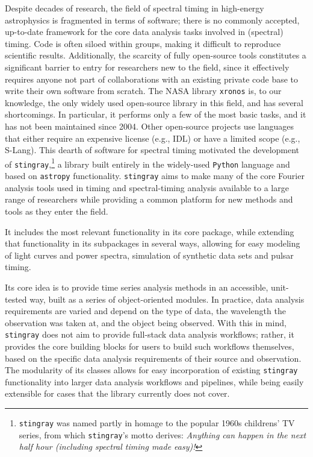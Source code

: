 \documentclass[twocolumn]{aastex62}
\newcommand{\python}{\texttt{Python}\xspace}
\newcommand{\stingray}{\texttt{stingray}\xspace}
\newcommand{\astropy}{\texttt{astropy}\xspace}
\begin{document}
Despite decades of research, the field of spectral timing in high-energy astrophysics is fragmented in terms of software; there is no commonly accepted, up-to-date framework for the core data analysis tasks involved in (spectral) timing. 
Code is often siloed within groups, making it difficult to reproduce scientific results. 
Additionally, the scarcity of fully open-source tools constitutes a significant barrier to entry for researchers new to the field, since it effectively requires anyone not part of collaborations with an existing private code base to write their own software from scratch. 
The NASA library \texttt{xronos} is, to our knowledge, the only widely used open-source library in this field, and has several shortcomings. 
In particular, it performs only a few of the most basic tasks, and it has not been maintained since 2004. 
Other open-source projects use languages that either require an expensive license (e.g., IDL) or have a limited scope (e.g., S-Lang).
This dearth of  software for spectral timing motivated the development of \stingray,\footnote{\stingray was named partly in homage to the popular 1960s childrens' TV series, from which \stingray's motto derives: \textit{Anything can happen in the next half hour (including spectral timing made easy)!}} a library built entirely in the widely-used \python language and based on \astropy functionality. 
\stingray aims to make many of the core Fourier analysis tools used in timing and spectral-timing analysis available to a large range of researchers while providing a common platform for new methods and tools as they enter the field. 

It includes the most relevant functionality in its core package, while extending that functionality in its subpackages in several ways, allowing for easy modeling of light curves and power spectra, simulation of synthetic data sets and pulsar timing. 

Its core idea is to provide time series analysis methods in an accessible, unit-tested way, built as a series of object-oriented modules. 
In practice, data analysis requirements are varied and depend on the type of data, the wavelength the observation was taken at, and the object being observed. 
With this in mind, \stingray does not aim to provide full-stack data analysis workflows; rather, it provides the core building blocks for users to build such workflows themselves, based on the specific data analysis requirements of their source and observation. 
The modularity of its classes allows for easy incorporation of existing \stingray functionality into larger data analysis workflows and pipelines, while being easily extensible for cases that the library currently does not cover. 
\end{document}
